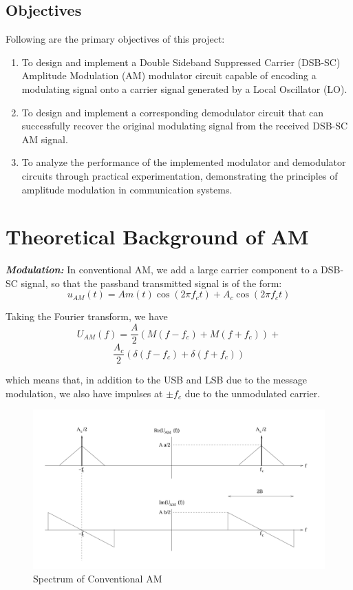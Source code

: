\documentclass[conference]{IEEEtran}
\begin{document}
\subsection{Objectives}
Following are the primary objectives of this project: 
\begin{enumerate}
    \item To design and implement a Double Sideband Suppressed Carrier (DSB-SC) Amplitude Modulation (AM) modulator circuit capable of encoding a modulating signal onto a carrier signal generated by a Local Oscillator (LO).
    \item To design and implement a corresponding demodulator circuit that can successfully recover the original modulating signal from the received DSB-SC AM signal.
    \item To analyze the performance of the implemented modulator and demodulator circuits through practical experimentation, demonstrating the principles of amplitude modulation in communication systems.
    
\end{enumerate}

\section{Theoretical Background of AM}

\textbf{\textit{Modulation: }}
In conventional AM, we add a large carrier component to a DSB-SC signal, so that the passband transmitted signal is of the form: 
\[ u_{AM}(t) = A m(t) \cos(2\pi f_c t) + A_c \cos(2\pi f_c t) \]

Taking the Fourier transform, we have 
\[ U_{AM}(f) = \frac{A}{2} \left( M(f - f_c) + M(f + f_c) \right) +\]
\[ \frac{A_c}{2} \left( \delta(f - f_c) + \delta(f + f_c) \right) \]

which means that, in addition to the USB and LSB due to the message modulation, we also have impulses at \( \pm f_c \) due to the unmodulated carrier.

\begin{figure}
    \centering
    \includegraphics[width=1\linewidth]{Conventional_AM_spectrum.png}
    \caption{Spectrum of Conventional AM}
\end{figure}
\end{document}
